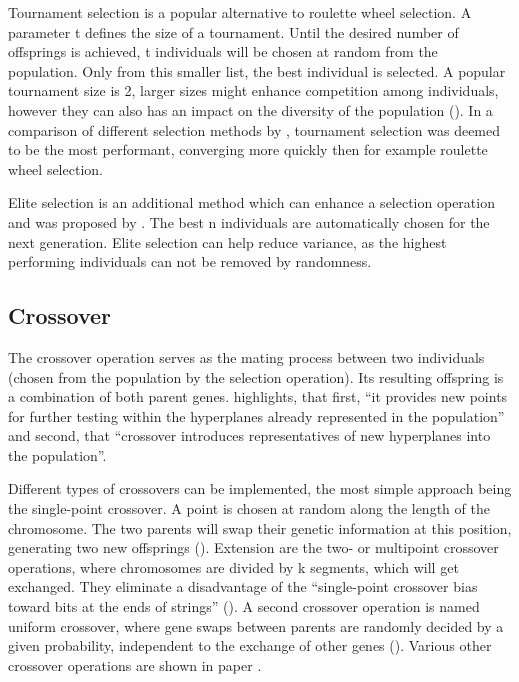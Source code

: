 Tournament selection is a popular alternative to roulette wheel selection. A parameter t defines the size of a tournament. Until the desired number of offsprings is achieved, t individuals will be chosen at random from the population. Only from this smaller list, the best individual is selected. A popular tournament size is 2, larger sizes might enhance competition among individuals, however they can also has an impact on the diversity of the population (\cite{hussain_trade-off_2020}). In a comparison of different selection methods by \cite{jinghui_zhong_comparison_2005}, tournament selection was deemed to be the most performant, converging more quickly then for example roulette wheel selection.

Elite selection is an additional method which can enhance a selection operation and was proposed by \cite{de_jong_analysis_1975}. The best n individuals are automatically chosen for the next generation. Elite selection can help reduce variance, as the highest performing individuals can not be removed by randomness.

\subsection{Crossover}
The crossover operation serves as the mating process between two individuals (chosen from the population by the selection operation). Its resulting offspring is a combination of both parent genes. \cite{grefenstette_optimization_1986} highlights, that first, \enquote{it provides new points for further testing within the hyperplanes already represented in the population} and second, that \enquote{crossover introduces representatives of new hyperplanes into the population}. 

Different types of crossovers can be implemented, the most simple approach being the single-point crossover. A point is chosen at random along the length of the chromosome. The two parents will swap their genetic information at this position, generating two new offsprings (\cite{katoch_review_2021}). Extension are the two- or multipoint crossover operations, where chromosomes are divided by k segments, which will get exchanged. They eliminate a disadvantage of the \enquote{single-point crossover bias toward bits at the ends of strings} (\cite{srinivas_genetic_1994}). A second crossover operation is named uniform crossover, where gene swaps between parents are randomly decided by a given probability, independent to the exchange of other genes (\cite{katoch_review_2021}). Various other crossover operations are shown in paper \cite{lim_crossover_2017}.


